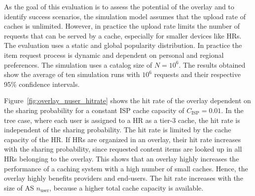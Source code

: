 As the goal of this evaluation is to assess the potential of the overlay and to identify success scenarios, the simulation model assumes that the upload rate of caches is unlimited. However, in practice the upload rate limits the number of requests that can be served by a cache, especially for smaller devices like HRs. The evaluation uses a static and global popularity distribution. In practice the item request process is dynamic and dependent on personal and regional preferences.
The simulation uses a catalog size of $N=10^6$. The results obtained show the average of ten simulation runs with $10^6$ requests and their respective 95\% confidence intervals.

Figure~\ref{fig:overlay_nuser_hitrate} shows the hit rate of the overlay dependent on the sharing probability for a constant ISP cache capacity of $C_\text{ISP}=0.01$. In the tree case, where each user is assigned to a HR as a tier-3 cache, the hit rate is independent of the sharing probability. The hit rate is limited by the cache capacity of the HR. If HRs are organized in an overlay, their hit rate increases with the sharing probability, since requested content items are looked up in all HRs belonging to the overlay. This shows that an overlay highly increases the performance of a caching system with a high number of small caches. Hence, the overlay highly benefits providers and end-users. The hit rate increases with the size of AS $n_\text{user}$, because a higher total cache capacity is available.


